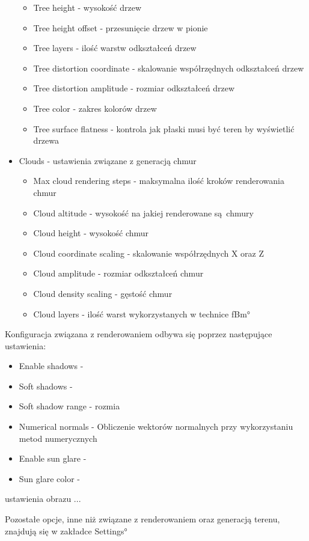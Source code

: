 \begin{itemize}
\begin{itemize}
    \item Tree height - wysokość drzew
    \item Tree height offset - przesunięcie drzew w pionie
    \item Tree layers - ilość warstw odkształceń drzew
    \item Tree distortion coordinate - skalowanie współrzędnych odkształceń drzew
    \item Tree distortion amplitude - rozmiar odkształceń drzew
    \item Tree color - zakres kolorów drzew
    \item Tree surface flatness - kontrola jak płaski musi być teren by wyświetlić drzewa
  \end{itemize}
\item Clouds - ustawienia związane z generacją chmur
  \begin{itemize}
    \item Max cloud rendering steps - maksymalna ilość kroków renderowania chmur
    \item Cloud altitude - wysokość na jakiej renderowane są chmury
    \item Cloud height - wysokość chmur
    \item Cloud coordinate scaling - skalowanie współrzędnych X oraz Z
    \item Cloud amplitude - rozmiar odkształceń chmur
    \item Cloud density scaling - gęstość  chmur
    \item Cloud layers - ilość warst wykorzystanych w technice \ang{fBm}
  \end{itemize}
\end{itemize}

Konfiguracja związana z renderowaniem odbywa się poprzez następujące ustawienia:
\begin{itemize}
\item Enable shadows -
\item Soft shadows -
\item Soft shadow range - rozmia
\item Numerical normals - Obliczenie wektorów normalnych przy wykorzystaniu metod numerycznych
\item Enable sun glare -
\item Sun glare color -
\end{itemize}

ustawienia obrazu
...

Pozostałe opcje, inne niż związane z renderowaniem oraz generacją terenu, znajdują się w zakładce \ang{Settings}

